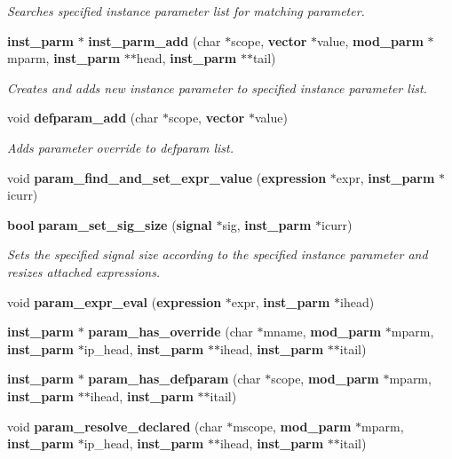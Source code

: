 \begin{CompactItemize}
\begin{CompactList}\small\item\em Searches specified instance parameter list for matching parameter.\item\end{CompactList}\item 
{\bf inst\_\-parm} $\ast$ {\bf inst\_\-parm\_\-add} (char $\ast$scope, {\bf vector} $\ast$value, {\bf mod\_\-parm} $\ast$mparm, {\bf inst\_\-parm} $\ast$$\ast$head, {\bf inst\_\-parm} $\ast$$\ast$tail)
\begin{CompactList}\small\item\em Creates and adds new instance parameter to specified instance parameter list.\item\end{CompactList}\item 
void {\bf defparam\_\-add} (char $\ast$scope, {\bf vector} $\ast$value)
\begin{CompactList}\small\item\em Adds parameter override to defparam list.\item\end{CompactList}\item 
void {\bf param\_\-find\_\-and\_\-set\_\-expr\_\-value} ({\bf expression} $\ast$expr, {\bf inst\_\-parm} $\ast$icurr)
\item 
{\bf bool} {\bf param\_\-set\_\-sig\_\-size} ({\bf signal} $\ast$sig, {\bf inst\_\-parm} $\ast$icurr)
\begin{CompactList}\small\item\em Sets the specified signal size according to the specified instance parameter and resizes attached expressions.\item\end{CompactList}\item 
void {\bf param\_\-expr\_\-eval} ({\bf expression} $\ast$expr, {\bf inst\_\-parm} $\ast$ihead)
\item 
{\bf inst\_\-parm} $\ast$ {\bf param\_\-has\_\-override} (char $\ast$mname, {\bf mod\_\-parm} $\ast$mparm, {\bf inst\_\-parm} $\ast$ip\_\-head, {\bf inst\_\-parm} $\ast$$\ast$ihead, {\bf inst\_\-parm} $\ast$$\ast$itail)
\item 
{\bf inst\_\-parm} $\ast$ {\bf param\_\-has\_\-defparam} (char $\ast$scope, {\bf mod\_\-parm} $\ast$mparm, {\bf inst\_\-parm} $\ast$$\ast$ihead, {\bf inst\_\-parm} $\ast$$\ast$itail)
\item 
void {\bf param\_\-resolve\_\-declared} (char $\ast$mscope, {\bf mod\_\-parm} $\ast$mparm, {\bf inst\_\-parm} $\ast$ip\_\-head, {\bf inst\_\-parm} $\ast$$\ast$ihead, {\bf inst\_\-parm} $\ast$$\ast$itail)

\end{CompactItemize}
